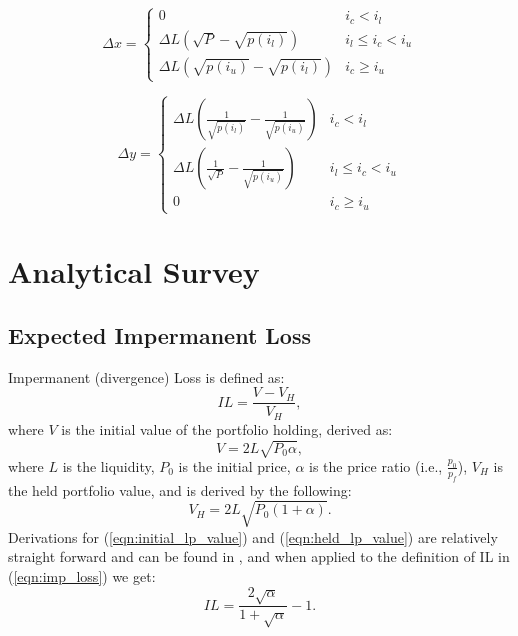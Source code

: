\documentclass[journal,twocolumn,12pt]{ieeesyscoin}
\begin{document}
\begin{equation}
  \Delta x =\begin{cases}
    0  & i_{c} < i_{l} \\
    \Delta L (\sqrt{P} - \sqrt{p(i_{l})}) & i_{l} \leq  i_{c} < i_{u}\\
    \Delta L (\sqrt{p(i_{u})} - \sqrt{p(i_{l})}) & i_{c} \geq i_{u}
  \end{cases}
\end{equation}

\begin{equation}
  \Delta y =\begin{cases}
    \Delta L (\frac{1}{\sqrt{p(i_{l})}} - \frac{1}{\sqrt{p(i_{u})}} ) & i_{c} < i_{l}\\
    \Delta L (\frac{1}{\sqrt{P}} - \frac{1}{\sqrt{p(i_{u})}}) & i_{l} \leq  i_{c} < i_{u} \\
    0  &i_{c} \geq i_{u}
  \end{cases}
\end{equation}

\section{Analytical Survey}

\subsection{Expected Impermanent Loss}
\label{sec:exp_impermanent_loss}

Impermanent (divergence) Loss is defined as:
\begin{equation}\label{eqn:imp_loss}
IL = \frac{V - V_{H}}{V_{H}},
\end{equation}
where $V$ is the initial value of the portfolio holding, derived as:
\begin{equation}\label{eqn:initial_lp_value}
V = 2L\sqrt{P_{0}\alpha},
\end{equation}
where $L$ is the liquidity, $P_{0}$ is the initial price, $\alpha$ is the price ratio (i.e., $\frac{p_{0}}{p_{f}}$), $V_{H}$ is the held portfolio value, and is derived by the following:
\begin{equation}\label{eqn:held_lp_value}
V_{H} = 2L\sqrt{P_{0} (1+\alpha)}.
\end{equation}
Derivations for (\ref{eqn:initial_lp_value}) and (\ref{eqn:held_lp_value}) are relatively straight forward and can be found in \cite{Aig21,Pet21}, and when applied to the definition of IL in (\ref{eqn:imp_loss}) we get:
\begin{equation}\label{eqn:imp_loss_derv}
IL = \frac{2\sqrt{\alpha}}{1+\sqrt{\alpha}} - 1.
\end{equation}
\end{document}
